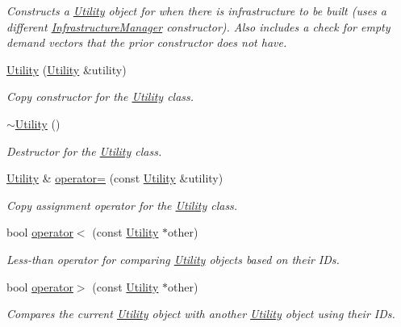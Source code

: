 \begin{DoxyCompactItemize}
\begin{DoxyCompactList}\small\item\em Constructs a \mbox{\hyperlink{classUtility}{Utility}} object for when there is infrastructure to be built (uses a different \mbox{\hyperlink{classInfrastructureManager}{Infrastructure\+Manager}} constructor). Also includes a check for empty demand vectors that the prior constructor does not have. \end{DoxyCompactList}\item 
\mbox{\hyperlink{classUtility_a44eaefb71f90fcf28143e3e919074a97}{Utility}} (\mbox{\hyperlink{classUtility}{Utility}} \&utility)
\begin{DoxyCompactList}\small\item\em Copy constructor for the \mbox{\hyperlink{classUtility}{Utility}} class. \end{DoxyCompactList}\item 
\mbox{\hyperlink{classUtility_aecfe4b31e39b00555158a2d8288b874a}{$\sim$\+Utility}} ()
\begin{DoxyCompactList}\small\item\em Destructor for the \mbox{\hyperlink{classUtility}{Utility}} class. \end{DoxyCompactList}\item 
\mbox{\hyperlink{classUtility}{Utility}} \& \mbox{\hyperlink{classUtility_a9a362d68a5aa3ec934c286f3a7e9b721}{operator=}} (const \mbox{\hyperlink{classUtility}{Utility}} \&utility)
\begin{DoxyCompactList}\small\item\em Copy assignment operator for the \mbox{\hyperlink{classUtility}{Utility}} class. \end{DoxyCompactList}\item 
bool \mbox{\hyperlink{classUtility_ae2dad8029e34c5bb073a5ddf4381d278}{operator$<$}} (const \mbox{\hyperlink{classUtility}{Utility}} $\ast$other)
\begin{DoxyCompactList}\small\item\em Less-\/than operator for comparing \mbox{\hyperlink{classUtility}{Utility}} objects based on their I\+Ds. \end{DoxyCompactList}\item 
bool \mbox{\hyperlink{classUtility_a222897e8c338fde0d754df4683fbc89b}{operator$>$}} (const \mbox{\hyperlink{classUtility}{Utility}} $\ast$other)
\begin{DoxyCompactList}\small\item\em Compares the current \mbox{\hyperlink{classUtility}{Utility}} object with another \mbox{\hyperlink{classUtility}{Utility}} object using their I\+Ds. \end{DoxyCompactList}\item 

\end{DoxyCompactItemize}
